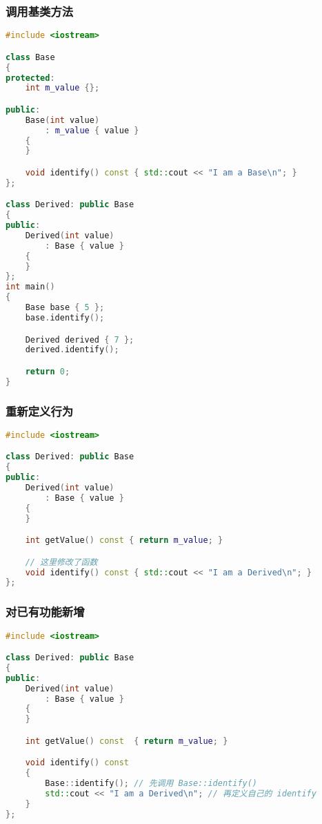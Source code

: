 \documentclass[../../LearnCpp.tex]{subfiles}
\begin{document}

\subsubsection*{调用基类方法}

\begin{lstlisting}[language=C++]
#include <iostream>

class Base
{
protected:
    int m_value {};

public:
    Base(int value)
        : m_value { value }
    {
    }

    void identify() const { std::cout << "I am a Base\n"; }
};

class Derived: public Base
{
public:
    Derived(int value)
        : Base { value }
    {
    }
};
int main()
{
    Base base { 5 };
    base.identify();

    Derived derived { 7 };
    derived.identify();

    return 0;
}
\end{lstlisting}

\subsubsection*{重新定义行为}

\begin{lstlisting}[language=C++]
#include <iostream>

class Derived: public Base
{
public:
    Derived(int value)
        : Base { value }
    {
    }

    int getValue() const { return m_value; }

    // 这里修改了函数
    void identify() const { std::cout << "I am a Derived\n"; }
};
\end{lstlisting}

\subsubsection*{对已有功能新增}

\begin{lstlisting}[language=C++]
#include <iostream>

class Derived: public Base
{
public:
    Derived(int value)
        : Base { value }
    {
    }

    int getValue() const  { return m_value; }

    void identify() const
    {
        Base::identify(); // 先调用 Base::identify()
        std::cout << "I am a Derived\n"; // 再定义自己的 identify
    }
};
\end{lstlisting}
\end{document}
